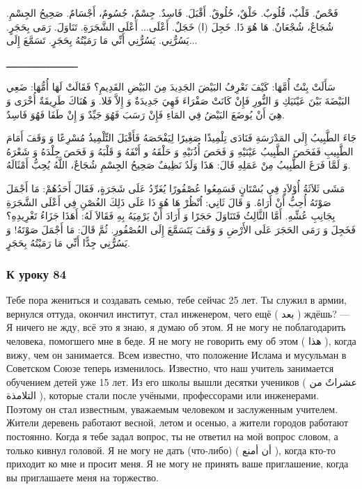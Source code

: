 \documentclass[a5paper]{article}
\begin{document}
فَحْصٌ. قَلْبٌ، قُلُوبٌ. حَلْقٌ، حُلُوقٌ. أَقْبَلَ. فَاسِدٌ. جِسْمٌ، جُسُومٌ، أَجْسَامٌ. صَحِيحُ الجِسْمِ. شُجَاعٌ، شُجْعَانٌ. هَا هُوَ ذَا. خَجِلَ (ا) خَجَلٌ. أَعْلَى... أَعْلَى الشَّجَرَةِ. تَنَاوَلَ. رَمَى بِحَجَرٍ. يَسُرُّنِي. يَسُرُّنِي أَنِّي مَا رَمَيْتُهُ بِحَجَرٍ. تَسَمَّعَ إِلَى...

ـــــــــــــــــــــــــ

سَأَلَتْ بِنْتٌ أُمَّهَا: كَيْفَ نَعْرِفُ البَيْضَ الجَدِيدَ مِنَ البَيْضِ القَدِيمِ؟ فَقَالَتْ لَهَا أُمُّهَا: ضَعِي البَيْضَةَ بَيْنَ عَيْنَيَكِ وَ النُّورِ فَإِنْ كَانَتْ صَفْرَاءَ فَهِيَ جَدِيدَةٌ وَ إِلاَّ فَلا. وَ هُنَاكَ طَرِيقَةٌ أُخْرَى وَ هِيَ أَنْ يُوضَعَ البَيْضُ فِي المَاءِ فَإِنْ رَسَبَ فَهُوَ جَيِّدٌ وَ إِنْ طَفَا فَهُوَ فَاسِدٌ.

جَاءَ الطَّبِيبُ إِلَى المَدْرَسَةِ فَنَادَى تِلْمِيذًا صَغِيرًا لِيَفْحَصَهُ فَأَقْبَلَ التِّلْمِيذُ مُسْرِعًا وَ وَقَفَ أَمَامَ الطَّبِيبِ فَفَحَصَ الطَّبِيبُ عَيْنَيْهِ وَ فَحَصَ أُذُنَيْهِ وَ حَلْقَهُ و أَنْفَهُ وَ قَلْبَهُ وَ فَحَصَ جِلْدَهُ وَ شَعْرَهُ وَ لَمَّا فَرَغَ الطَّبِيبُ مِنْ عَمَلِهِ قَالَ: هَذَا وَلَدٌ نَظِيفٌ صَحِيحُ الجِسْمِ شُجَاعٌ، اللَّهُ يُحِبُّ أَمْثَالَهُ.

مَشَى ثَلاَثَةُ أُوْلاَدٍ فِي بُسْتَانٍ فَسَمِعُوا عُصْفُورًا يُغَرِّدُ عَلَى شَجَرَةٍ، فَقَالَ أَحَدُهُمْ: مَا أَجْمَلَ صَوْتَهُ أُحِبُّ أَنْ أَرَاهُ. وَ قَالَ ثَانِي: اُنْظُرْ هَا هُوَ ذَا عَلَى ذَلِكَ الغُصْنِ فِي أَعْلَى الشَّجَرَةِ بِجَانِبِ عُشِّهِ. أَمَّا الثَّالِثُ فَتَنَاوَلَ حَجَرًا وَ أَرَادَ أَنْ يَرْمِيَهُ بِهِ فَقَالاَ لَهُ: أَهَذَا جَزَاءُ تَغْرِيدِهِ؟ فَخَجِلَ وَ رَمَى الحَجَرَ عَلَى الأَرْضِ وَ وَقَفَ يَتَسَمَّعَ إِلَى العُصْفُورِ. ثُمَّ قَالَ: مَا أَجْمَلَ صَوْتَهُ! وَ يَسُرُّنِي جِدًّا أَنِّي مَا رَمَيْتُهُ بِحَجَرٍ.

\subsubsection{К уроку 84}
Тебе пора жениться и создавать семью, тебе сейчас 25 лет. Ты служил в армии, вернулся оттуда, окончил институт, стал инженером, чего ещё ( بعد ) ждёшь? — Я ничего не жду, всё это я знаю, я думаю об этом. Я не могу не поблагодарить человека, помогшего мне в беде. Я не могу не говорить ему об этом ( هذا ), когда вижу, чем он занимается. Всем известно, что положение Ислама и мусульман в Советском Союзе теперь изменилось. Известно, что наш учитель занимается обучением детей уже 15 лет. Из его школы вышли десятки учеников ( عشراتٌ من التلامذة ), которые стали после учёными, профес­сорами или инженерами. Поэтому он стал известным, уважаемым человеком и заслуженным учителем. Жители деревень работают весной, летом и осенью, а жители городов работают постоянно. Когда я тебе задал вопрос, ты не ответил на мой вопрос словом, а только кивнул головой. Я не могу не дать (что-либо) ( أن أمنع ), когда кто-то приходит ко мне и просит меня. Я не могу не принять ваше приглашение, когда вы приглашаете меня на торжество.
\end{document}
